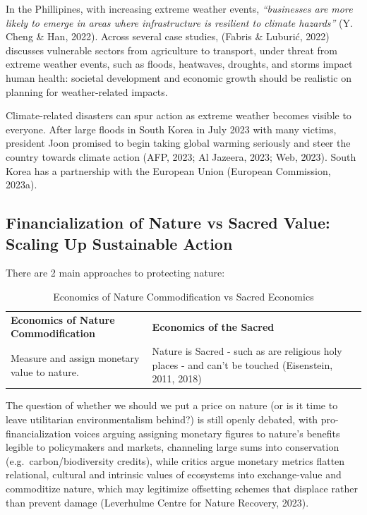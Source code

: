 \documentclass[
  12pt,
  letterpaper,
  DIV=11,
  numbers=noendperiod]{scrartcl}
\begin{document}
In the Phillipines, with increasing extreme weather events,
\emph{``businesses are more likely to emerge in areas where
infrastructure is resilient to climate hazards''} (Y. Cheng \& Han,
2022). Across several case studies, (Fabris \& Luburić, 2022) discusses
vulnerable sectors from agriculture to transport, under threat from
extreme weather events, such as floods, heatwaves, droughts, and storms
impact human health: societal development and economic growth should be
realistic on planning for weather-related impacts.

Climate-related disasters can spur action as extreme weather becomes
visible to everyone. After large floods in South Korea in July 2023 with
many victims, president Joon promised to begin taking global warming
seriously and steer the country towards climate action (AFP, 2023; Al
Jazeera, 2023; Web, 2023). South Korea has a partnership with the
European Union (European Commission, 2023a).

\subsection{Financialization of Nature vs Sacred Value: Scaling Up
Sustainable
Action}\label{financialization-of-nature-vs-sacred-value-scaling-up-sustainable-action}

There are 2 main approaches to protecting nature:

\def\pandoctableshortcapt{Economics of Nature Commodification vs Sacred
Economics}

\begin{longtable}[]{@{}
  >{\raggedright\arraybackslash}p{}
  >{\raggedright\arraybackslash}p{}@{}}
\caption[Economics of Nature Commodification vs Sacred
Economics]{Economics of Nature Commodification vs Sacred
Economics}\tabularnewline
\toprule\noalign{}
\endfirsthead
\endhead
\bottomrule\noalign{}
\endlastfoot
\textbf{Economics of Nature Commodification} & \textbf{Economics of the
Sacred} \\
Measure and assign monetary value to nature. & Nature is Sacred - such
as are religious holy places - and can't be touched (Eisenstein, 2011,
2018) \\
\end{longtable}

\let\pandoctableshortcapt\relax

The question of whether we should we put a price on nature (or is it
time to leave utilitarian environmentalism behind?) is still openly
debated, with pro-financialization voices arguing assigning monetary
figures to nature's benefits legible to policymakers and markets,
channeling large sums into conservation (e.g.~carbon/biodiversity
credits), while critics argue monetary metrics flatten relational,
cultural and intrinsic values of ecosystems into exchange-value and
commoditize nature, which may legitimize offsetting schemes that
displace rather than prevent damage (Leverhulme Centre for Nature
Recovery, 2023).
\end{document}
